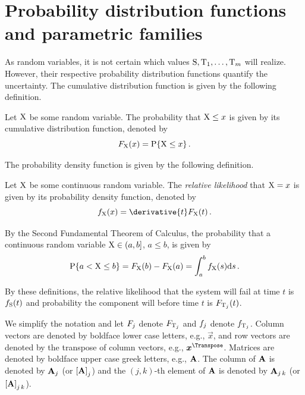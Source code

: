 \documentclass[../main.tex]{subfiles}
\begin{document}
\section{Probability distribution functions and parametric families}
As random variables, it is not certain which values $\mathrm{S},\mathrm{T}_1,\ldots,\mathrm{T}_m$ 
will realize. However, their respective probability distribution functions 
quantify the uncertainty. The cumulative distribution function is given by the 
following definition.
\begin{definition}
    \label{def:cdf_function}
    Let $\mathrm{X}$ be some random variable. The probability that $\mathrm{X} \leq x$ 
    is given by its cumulative distribution function, denoted by
    \begin{equation}
    F_{\mathrm{X}}\!\left(x\right) = \mathrm{P}\{\mathrm{X} \leq x\}\,.
    \end{equation}
\end{definition}
The probability density function is given by the following definition.
\begin{definition}
    \label{def:pdf}
    Let $\mathrm{X}$ be some continuous random variable. The \emph{relative 
        likelihood} that $\mathrm{X} = x$ is given by its probability density 
    function, denoted by
    \begin{equation}
    \pdf_{\RV{X}}(x) = \derivative{t}\cdf_{\RV{X}}(t)\,.
    \end{equation}
\end{definition}
By the Second Fundamental Theorem of Calculus, the probability that a 
continuous random variable $\mathrm{X} \in \left(a,b\right]$, $a \leq b$, is given 
by
\begin{equation}
\label{eq:prob_F_R_p}
\mathrm{P}\{a < \mathrm{X} \leq b\} = F_{\mathrm{X}}(b) - F_{\mathrm{X}}(a) = \int_{a}^{b} 
f_{\mathrm{X}}(s) \mathrm{d}s\,.
\end{equation}

By these definitions, the relative likelihood that the system will fail at time 
$t$ is $f_{\mathrm{S}}(t)$ and probability the \jth component will before time $t$ is 
$F_{\mathrm{T}_j}(t)$.
\begin{notation}
We simplify the notation and let $F_j$ denote $F_{\mathrm{T}_j}$ and $f_j$ denote $f_{\mathrm{T}_j}$.
Column vectors are denoted by boldface lower case letters, e.g., $\vec{x}$, and row vectors are denoted by the transpose of column vectors, e.g., $\vec{x}^\Transpose$.
Matrices are denoted by boldface upper case greek letters, e.g., $\mathbf{A}$.
The \jth column of $\mathbf{A}$ is denoted by $\mathbf{A}_j$ (or $\left[\mathbf{A}\right]_j$) and the $(j,k)$-th element of $\mathbf{A}$ is denoted by $\mathbf{A}_{j\,k}$ (or $\left[\mathbf{A}\right]_{j\,k}$).
\end{notation}
\end{document}
